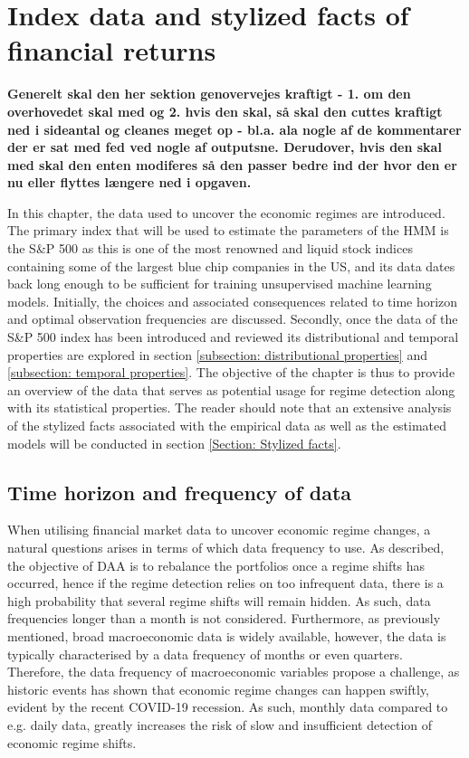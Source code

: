 \section{Index data and stylized facts of financial returns}
\label{section: Data}

\textbf{Generelt skal den her sektion genovervejes kraftigt - 1. om den overhovedet skal med og 2. hvis den skal, så skal den cuttes kraftigt ned i sideantal og cleanes meget op - bl.a. ala nogle af de kommentarer der er sat med fed ved nogle af outputsne. Derudover, hvis den skal med skal den enten modiferes så den passer bedre ind der hvor den er nu eller flyttes længere ned i opgaven.}

In this chapter, the data used to uncover the economic regimes are introduced. The primary index that will be used to estimate the parameters of the HMM is the S\&P 500 as this is one of the most renowned and liquid stock indices containing some of the largest blue chip companies in the US, and its data dates back long enough to be sufficient for training unsupervised machine learning models. Initially, the choices and associated consequences related to time horizon and optimal observation frequencies are discussed. Secondly, once the data of the S\&P 500 index has been introduced and reviewed its distributional and temporal properties are explored in section \ref{subsection: distributional properties} and \ref{subsection: temporal properties}. The objective of the chapter is thus to provide an overview of the data that serves as potential usage for regime detection along with its statistical properties. The reader should note that an extensive analysis of the stylized facts associated with the empirical data as well as the estimated models will be conducted in section \ref{Section: Stylized facts}.  

\subsection*{Time horizon and frequency of data}
\label{subsection: Data frequency}
When utilising financial market data to uncover economic regime changes, a natural questions arises in terms of which data frequency to use. As described, the objective of DAA is to rebalance the portfolios once a regime shifts has occurred, hence if the regime detection relies on too infrequent data, there is a high probability that several regime shifts will remain hidden. As such, data frequencies longer than a month is not considered. Furthermore, as previously mentioned, broad macroeconomic data is widely available, however, the data is typically characterised by a data frequency of months or even quarters. Therefore, the data frequency of macroeconomic variables propose a challenge, as historic events has shown that economic regime changes can happen swiftly, evident by the recent COVID-19 recession. As such, monthly data compared to e.g. daily data, greatly increases the risk of slow and insufficient detection of economic regime shifts.
 
